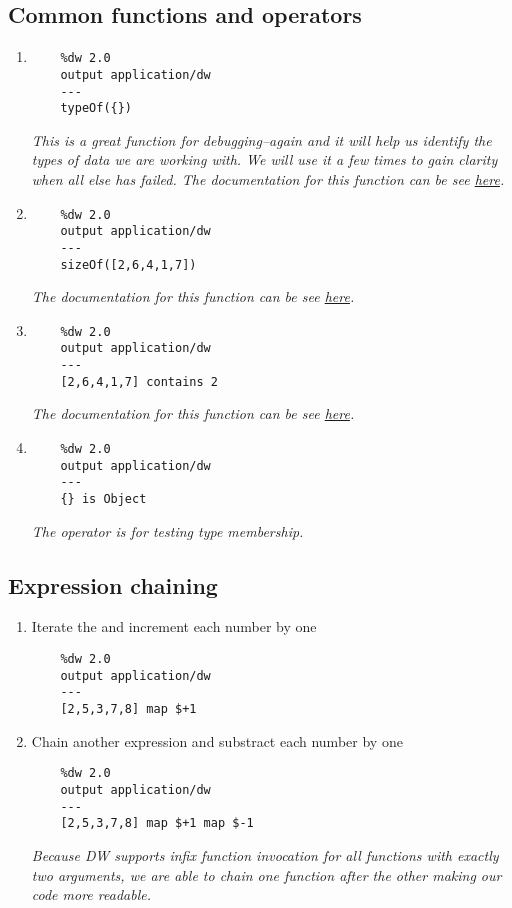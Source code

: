\subsection{Common functions and operators}
\begin{enumerate}[resume*]
\item {}
  \begin{lstlisting}
    %dw 2.0
    output application/dw
    ---
    typeOf({})
  \end{lstlisting}
  \emph{
    This is a great function for debugging--again and it will help us identify the types of
    data we are working with.  We will use it a few times to gain clarity when all else has
    failed.
    \newline
    The documentation for this function can be see \href{https://docs.mulesoft.com/mule-runtime/4.3/dw-core-functions-typeof}{here}.
  }
\item {}
  \begin{lstlisting}
    %dw 2.0
    output application/dw
    ---
    sizeOf([2,6,4,1,7])
  \end{lstlisting}
  \emph{
    The documentation for this function can be see \href{https://docs.mulesoft.com/mule-runtime/4.3/dw-core-functions-sizeof}{here}.
  }
\item {}
  \begin{lstlisting}
    %dw 2.0
    output application/dw
    ---
    [2,6,4,1,7] contains 2
  \end{lstlisting}
  \emph{
    The documentation for this function can be see \href{https://docs.mulesoft.com/mule-runtime/4.3/dw-core-functions-contains}{here}.
  }
\item {}
  \begin{lstlisting}
    %dw 2.0
    output application/dw
    ---
    {} is Object    
  \end{lstlisting}
  \emph{
    The  operator is for testing type membership.
  }
\end{enumerate}

\subsection{Expression chaining}
\begin{enumerate}[resume*]
\item Iterate the \ttt{[2,5,3,7,8]} and increment each number by one
  \begin{lstlisting}
    %dw 2.0
    output application/dw
    ---
    [2,5,3,7,8] map $+1
  \end{lstlisting}
\item Chain another expression and substract each number by one
  \begin{lstlisting}
    %dw 2.0
    output application/dw
    ---
    [2,5,3,7,8] map $+1 map $-1
  \end{lstlisting}
  \emph{
    Because DW supports infix function invocation for all functions with exactly two arguments, we are able to chain one function after the other making our code more readable.
  }
\end{enumerate}

